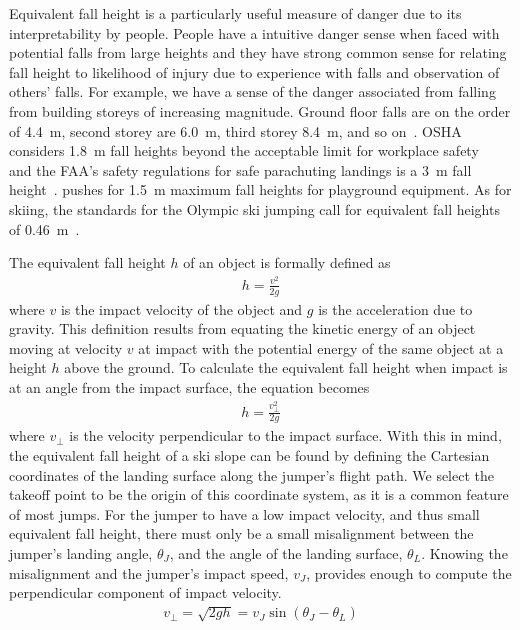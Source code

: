 \documentclass{article}
\begin{document}
Equivalent fall height is a particularly useful measure of danger due to its
interpretability by people. People have a intuitive danger sense when faced
with potential falls from large heights and they have strong common sense for
relating fall height to likelihood of injury due to experience with falls and
observation of others' falls. For example, we have a sense of the danger
associated from falling from building storeys of increasing magnitude. Ground
floor falls are on the order of 4.4~\si{\meter}, second storey are
6.0~\si{\meter}, third storey 8.4~\si{\meter}, and so on~\cite{Vish2005}. OSHA
considers 1.8~\si{\meter} fall heights beyond the acceptable limit for
workplace safety~ and the FAA's safety regulations for safe
parachuting landings is a 3~\si{\meter} fall height~.
\cite{Chalmers1996} pushes for 1.5~\si{\meter} maximum fall heights for
playground equipment. As for skiing, the standards for the Olympic ski jumping
call for equivalent fall heights of 0.46~\si{\meter}~.

The equivalent fall height $h$ of an object is formally defined as
%
\begin{align}
  h = \frac{v^2}{2g}
  \label{eq:efh_general}
\end{align}
%
where $v$ is the impact velocity of the object and $g$ is the acceleration due
to gravity. This definition results from equating the kinetic energy of an
object moving at velocity $v$ at impact with the potential energy of the same
object at a height $h$ above the ground. To calculate the equivalent fall
height when impact is at an angle from the impact surface, the equation becomes
%
\begin{align}
  h = \frac{v_{\perp}^2}{2g}
  \label{eq:efh_slope}
\end{align}
%
where $v_{\perp}$ is the velocity perpendicular to the impact surface. With
this in mind, the equivalent fall height of a ski slope can be found by
defining the Cartesian coordinates of the landing surface along the jumper's flight
path. We select the takeoff point to be the origin of this coordinate system,
as it is a common feature of most jumps.
For the jumper to have a low impact velocity, and thus small equivalent fall
height, there must only be a small misalignment between the jumper's landing angle,
$\theta_J$, and the angle of the landing surface, $\theta_L$. Knowing the
misalignment and the jumper's impact speed, $v_J$, provides enough to compute
the perpendicular component of impact velocity.
%
\begin{align}
  v_{\perp} = \sqrt{2gh} = v_J\sin(\theta_J - \theta_L)
\end{align}
\end{document}
